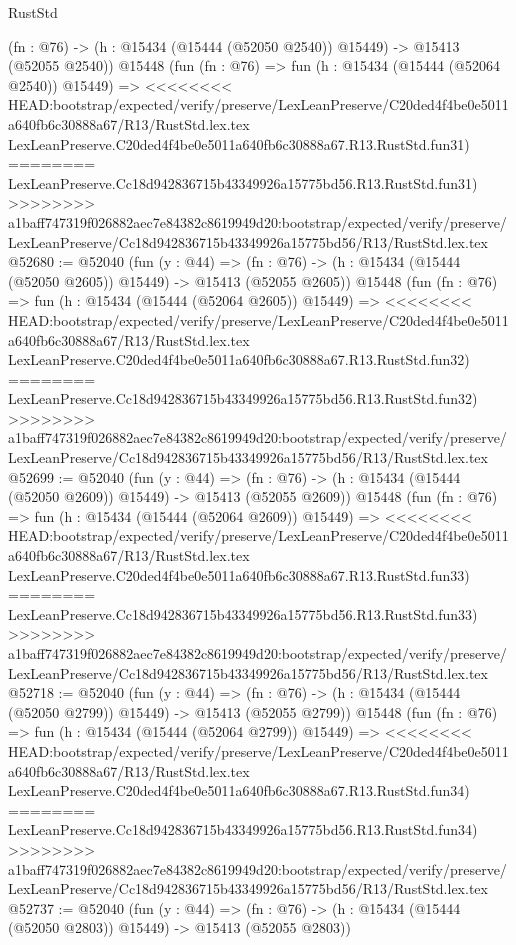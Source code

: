 \begin{lexlean}{RustStd}
\begin{coremodule}
{\begin{coremodule}
{{{{{{{{{{{{{{{{{{{{{{{{{{{{{{{{{{{{{{{{{{{{{{{{{{{{{{{{{{{{    (fn : @76) -> (h : @15434 (@15444 (@52050 @2540)) @15449) -> @15413 (@52055 @2540))
    @15448
    (fun (fn : @76) =>
    fun (h : @15434 (@15444 (@52064 @2540)) @15449) =>
<<<<<<<< HEAD:bootstrap/expected/verify/preserve/LexLeanPreserve/C20ded4f4be0e5011a640fb6c30888a67/R13/RustStd.lex.tex
    LexLeanPreserve.C20ded4f4be0e5011a640fb6c30888a67.R13.RustStd.fun31)
========
    LexLeanPreserve.Cc18d942836715b43349926a15775bd56.R13.RustStd.fun31)
>>>>>>>> a1baff747319f026882aec7e84382c8619949d20:bootstrap/expected/verify/preserve/LexLeanPreserve/Cc18d942836715b43349926a15775bd56/R13/RustStd.lex.tex
@52680 := @52040
    (fun (y : @44) =>
    (fn : @76) -> (h : @15434 (@15444 (@52050 @2605)) @15449) -> @15413 (@52055 @2605))
    @15448
    (fun (fn : @76) =>
    fun (h : @15434 (@15444 (@52064 @2605)) @15449) =>
<<<<<<<< HEAD:bootstrap/expected/verify/preserve/LexLeanPreserve/C20ded4f4be0e5011a640fb6c30888a67/R13/RustStd.lex.tex
    LexLeanPreserve.C20ded4f4be0e5011a640fb6c30888a67.R13.RustStd.fun32)
========
    LexLeanPreserve.Cc18d942836715b43349926a15775bd56.R13.RustStd.fun32)
>>>>>>>> a1baff747319f026882aec7e84382c8619949d20:bootstrap/expected/verify/preserve/LexLeanPreserve/Cc18d942836715b43349926a15775bd56/R13/RustStd.lex.tex
@52699 := @52040
    (fun (y : @44) =>
    (fn : @76) -> (h : @15434 (@15444 (@52050 @2609)) @15449) -> @15413 (@52055 @2609))
    @15448
    (fun (fn : @76) =>
    fun (h : @15434 (@15444 (@52064 @2609)) @15449) =>
<<<<<<<< HEAD:bootstrap/expected/verify/preserve/LexLeanPreserve/C20ded4f4be0e5011a640fb6c30888a67/R13/RustStd.lex.tex
    LexLeanPreserve.C20ded4f4be0e5011a640fb6c30888a67.R13.RustStd.fun33)
========
    LexLeanPreserve.Cc18d942836715b43349926a15775bd56.R13.RustStd.fun33)
>>>>>>>> a1baff747319f026882aec7e84382c8619949d20:bootstrap/expected/verify/preserve/LexLeanPreserve/Cc18d942836715b43349926a15775bd56/R13/RustStd.lex.tex
@52718 := @52040
    (fun (y : @44) =>
    (fn : @76) -> (h : @15434 (@15444 (@52050 @2799)) @15449) -> @15413 (@52055 @2799))
    @15448
    (fun (fn : @76) =>
    fun (h : @15434 (@15444 (@52064 @2799)) @15449) =>
<<<<<<<< HEAD:bootstrap/expected/verify/preserve/LexLeanPreserve/C20ded4f4be0e5011a640fb6c30888a67/R13/RustStd.lex.tex
    LexLeanPreserve.C20ded4f4be0e5011a640fb6c30888a67.R13.RustStd.fun34)
========
    LexLeanPreserve.Cc18d942836715b43349926a15775bd56.R13.RustStd.fun34)
>>>>>>>> a1baff747319f026882aec7e84382c8619949d20:bootstrap/expected/verify/preserve/LexLeanPreserve/Cc18d942836715b43349926a15775bd56/R13/RustStd.lex.tex
@52737 := @52040
    (fun (y : @44) =>
    (fn : @76) -> (h : @15434 (@15444 (@52050 @2803)) @15449) -> @15413 (@52055 @2803))
}}}}}}}}}}}}}}}}}}}}}}}}}}}}}}}}}}}}}}}}}}}}}}}}}}}}}}}}}}}}
\end{coremodule}}
\end{coremodule}
\end{lexlean}
